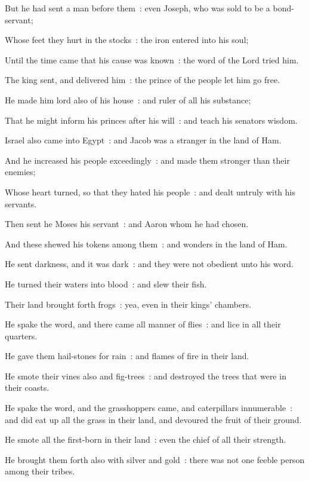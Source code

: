 But he had sent a man before them~: even Joseph, who was sold to be a bond-servant;\par
{}Whose feet they hurt in the stocks~: the iron entered into his soul;\par
{}Until the time came that his cause was known~: the word of the Lord tried him.\par
{}The king sent, and delivered him~: the prince of the people let him go free.\par
{}He made him lord also of his house~: and ruler of all his substance;\par
{}That he might inform his princes after his will~: and teach his senators wisdom.\par
{}Israel also came into Egypt~: and Jacob was a stranger in the land of Ham.\par
{}And he increased his people exceedingly~: and made them stronger than their enemies;\par
{}Whose heart turned, so that they hated his people~: and dealt untruly with his servants.\par
{}Then sent he Moses his servant~: and Aaron whom he had chosen.\par
{}And these shewed his tokens among them~: and wonders in the land of Ham.\par
{}He sent darkness, and it was dark~: and they were not obedient unto his word.\par
{}He turned their waters into blood~: and slew their fish.\par
{}Their land brought forth frogs~: yea, even in their kings' chambers.\par
{}He spake the word, and there came all manner of flies~: and lice in all their quarters.\par
{}He gave them hail-stones for rain~: and flames of fire in their land.\par
{}He smote their vines also and fig-trees~: and destroyed the trees that were in their coasts.\par
{}He spake the word, and the grasshoppers came, and caterpillars innumerable~: and did eat up all the grass in their land, and devoured the fruit of their ground.\par
{}He smote all the first-born in their land~: even the chief of all their strength.\par
{}He brought them forth also with silver and gold~: there was not one feeble person among their tribes.\par
